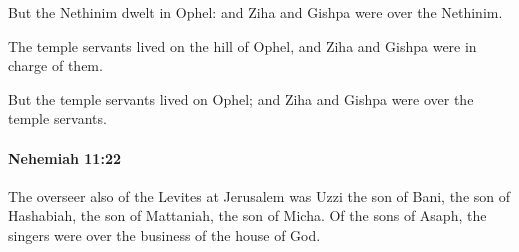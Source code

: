 			\begin{versebox}
					\item[BHS] 
					\item[ASV] But the Nethinim dwelt in Ophel: and Ziha and Gishpa were over the Nethinim.
					\item[NIV] The temple servants lived on the hill of Ophel, and Ziha and Gishpa were in charge of them.
					\item[NRSV] But the temple servants lived on Ophel; and Ziha and Gishpa were over the temple servants.
			\end{versebox}

		\paragraph{Nehemiah 11:22} %
			\label{NEHEMIAH-11-22}

			The overseer also of the Levites at Jerusalem was Uzzi the son of Bani, the son of Hashabiah, the son of Mattaniah, the son of Micha. Of the sons of Asaph, the singers were over the business of the house of God.


